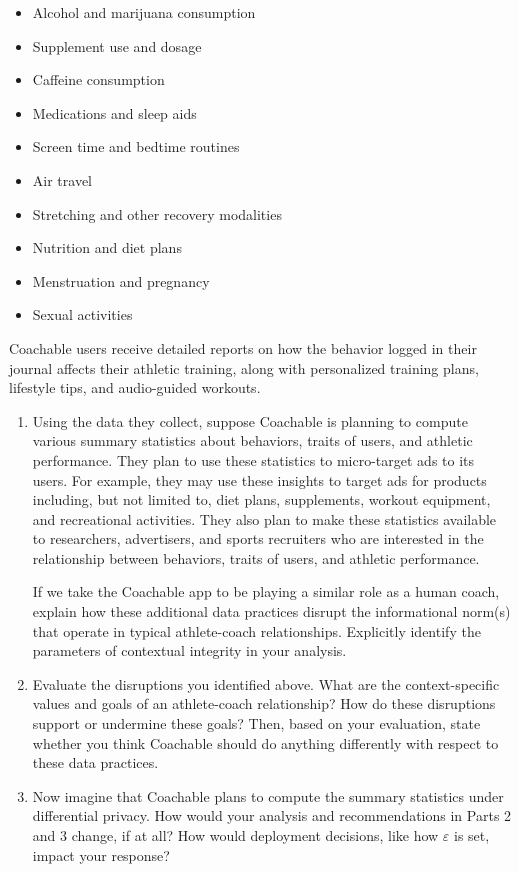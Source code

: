 \documentclass[11pt]{article}
\begin{document}
\begin{enumerate}[leftmargin=*]
\begin{itemize}
    \item Alcohol and marijuana consumption 
    \item Supplement use and dosage 
    \item Caffeine consumption 
    \item Medications and sleep aids 
    \item Screen time and bedtime routines
    \item Air travel 
    \item Stretching and other recovery modalities 
    \item Nutrition and diet plans 
    \item Menstruation and pregnancy
    \item Sexual activities
\end{itemize}

Coachable users receive detailed reports on how the behavior logged in their journal affects their athletic training, along with personalized training plans, lifestyle tips, and audio-guided workouts.

\begin{enumerate}
    \item Using the data they collect, suppose Coachable is planning to compute various summary statistics about behaviors, traits of users, and athletic performance. They plan to use these statistics to micro-target ads to its users. For example, they may use these insights to target ads for products including, but not limited to, diet plans, supplements, workout equipment, and recreational activities. They also plan to make these statistics available to researchers, advertisers, and sports recruiters who are interested in the relationship between behaviors, traits of users, and athletic performance.
    
    If we take the Coachable app to be playing a similar role as a human coach, explain how these additional data practices disrupt the informational norm(s) that operate in typical athlete-coach relationships. Explicitly identify the parameters of contextual integrity in your analysis.

    \item Evaluate the disruptions you identified above. What are the context-specific values and goals of an athlete-coach relationship? How do these disruptions support or undermine these goals? Then, based on your evaluation, state whether you think Coachable should do anything differently with respect to these data practices. 

    \item Now imagine that Coachable plans to compute the summary statistics under differential privacy. How would your analysis and recommendations in Parts 2 and 3 change, if at all? How would deployment decisions, like how $\varepsilon$ is set, impact your response?

    \end{enumerate}
\end{enumerate}
\end{document}
